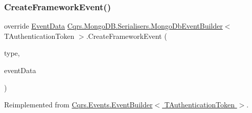 \subsubsection{\texorpdfstring{Create\+Framework\+Event()}{CreateFrameworkEvent()}}
{\footnotesize\ttfamily override \hyperlink{classCqrs_1_1Events_1_1EventData}{Event\+Data} \hyperlink{classCqrs_1_1MongoDB_1_1Serialisers_1_1MongoDbEventBuilder}{Cqrs.\+Mongo\+D\+B.\+Serialisers.\+Mongo\+Db\+Event\+Builder}$<$ T\+Authentication\+Token $>$.Create\+Framework\+Event (\begin{DoxyParamCaption}\item[{string}]{type,  }\item[{\hyperlink{interfaceCqrs_1_1Events_1_1IEvent}{I\+Event}$<$ T\+Authentication\+Token $>$}]{event\+Data }\end{DoxyParamCaption})\hspace{0.3cm}{\ttfamily [virtual]}}



Reimplemented from \hyperlink{classCqrs_1_1Events_1_1EventBuilder_aa6a794ef27f2795802a4390fd16535f6}{Cqrs.\+Events.\+Event\+Builder$<$ T\+Authentication\+Token $>$}.


